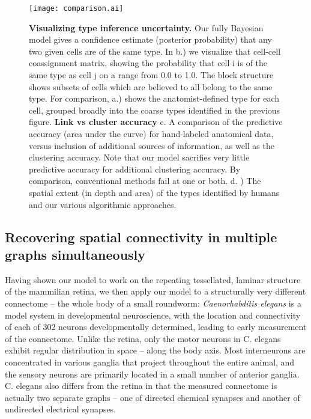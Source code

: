 \documentclass{article}
\begin{document}
\begin{figure}
  \centering 
  \centerline{\texttt{[image: comparison.ai]}}
  \caption{\textbf{Visualizing type inference uncertainty.} Our fully Bayesian model gives a confidence estimate (posterior probability) that any two given cells are of the same type. In b.) we visualize that cell-cell coassignment matrix, showing the probability that cell i is of the same type as cell j on a range from 0.0 to 1.0. The block structure shows subsets of cells which are believed to all belong to the same type. For comparison, a.) shows the anatomist-defined type for each cell, grouped broadly into the coarse types identified in the previous figure. \textbf{Link vs cluster accuracy} c. A comparison of the
    predictive accuracy (area under the curve) for hand-labeled
    anatomical data, versus inclusion of additional sources of
    information, as well as the clustering accuracy. Note that our model sacrifies very little predictive accuracy for additional clustering accuracy. By comparison, conventional methods fail at one or both.  d. ) The spatial extent (in depth and area) of the
    types identified by humans and our various algorithmic
    approaches.}

\label{fig:mouseretina_compare}
\end{figure}



\subsection*{Recovering spatial connectivity in multiple graphs simultaneously}

Having shown our model to work on the repeating tessellated, laminar structure of the mammilian retina, we then apply our model to a structurally very different connectome -- the whole body of a small roundworm: 
\textit{Caenorhabditis elegans} is a model system in
developmental neuroscience\autocite{White1986}, with the location and
connectivity of each of 302 neurons developmentally determined,
leading to early measurement of the connectome. Unlike the retina,
only the motor neurons in C. elegans exhibit regular distribution in
space -- along the body axis. Most interneurons are
concentrated in various ganglia that project throughout the entire
animal, and the sensory neurons are primarily located in a small
number of anterior ganglia. C. elegans also differs from the retina in that the measured connectome is actually two separate graphs -- one of directed chemical synapses and another of undirected electrical synapses. 
\end{document}
